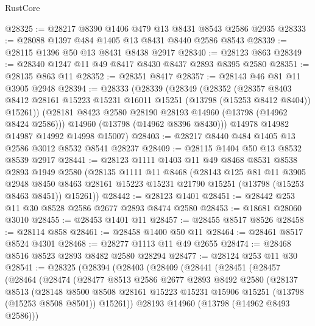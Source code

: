 \begin{lexlean}{RustCore}
\begin{coremodule}
@28325 := @28217 @8390 @1406 @479 @13 @8431 @8543 @2586 @2935
@28333 := @28088 @1397 @484 @1405 @13 @8431 @8440 @2586 @8543
@28339 := @28115 @1396 @50 @13 @8431 @8438 @2917
@28340 := @28123 @863
@28349 := @28340 @1247 @11 @49 @8417 @8430 @8437 @2893 @8395 @2580
@28351 := @28135 @863 @11
@28352 := @28351 @8417
@28357 := @28143 @46 @81 @11 @3905 @2948
@28394 := @28333
    (@28339
      (@28349
        (@28352
          (@28357
            @8403
            @8412
            @28161
            @15223
            @15231
            @16011
            @15251
            (@13798 (@15253 @8412 @8404))
            @15261))
        (@28181 @8423 @2580 @28190 @28193 @14960 (@13798 (@14962 @8424 @2586)))
        @14960
        (@13798 (@14962 @8396 @8430)))
      @14978
      @14982
      @14987
      @14992
      @14998
      @15007)
@28403 := @28217 @8440 @484 @1405 @13 @2586 @3012 @8532 @8541 @28237
@28409 := @28115 @1404 @50 @13 @8532 @8539 @2917
@28441 := @28123
    @1111
    @1403
    @11
    @49
    @8468
    @8531
    @8538
    @2893
    @1949
    @2580
    (@28135
      @1111
      @11
      @8468
      (@28143
        @125
        @81
        @11
        @3905
        @2948
        @8450
        @8463
        @28161
        @15223
        @15231
        @21790
        @15251
        (@13798 (@15253 @8463 @8451))
        @15261))
@28442 := @28123 @1401
@28451 := @28442 @253 @11 @30 @8528 @2586 @2677 @2893 @8474 @2580
@28453 := @18681 @28060 @3010
@28455 := @28453 @1401 @11
@28457 := @28455 @8517 @8526
@28458 := @28114 @858
@28461 := @28458 @1400 @50 @11
@28464 := @28461 @8517 @8524 @4301
@28468 := @28277 @1113 @11 @49 @2655
@28474 := @28468 @8516 @8523 @2893 @8482 @2580 @28294
@28477 := @28124 @253 @11 @30
@28541 := @28325
    (@28394
      (@28403
        (@28409
          (@28441
            (@28451
              (@28457
                (@28464
                  (@28474
                    (@28477
                      @8513
                      @2586
                      @2677
                      @2893
                      @8492
                      @2580
                      (@28137
                        @8513
                        (@28148
                          @8500
                          @8508
                          @28161
                          @15223
                          @15231
                          @15906
                          @15251
                          (@13798 (@15253 @8508 @8501))
                          @15261))
                      @28193
                      @14960
                      (@13798 (@14962 @8493 @2586)))

\end{coremodule}
\end{lexlean}
